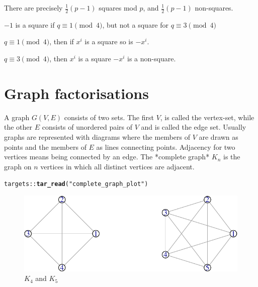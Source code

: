 \documentclass[
  11pt,
  a4paper]{book}\usepackage[]{graphicx}\usepackage[]{xcolor}
\makeatletter
\def\maxwidth{ %
  \ifdim\Gin@nat@width>\linewidth
    \linewidth
  \else
    \Gin@nat@width
  \fi
}
\newcommand{\hlstr}[1]{\textcolor[rgb]{0.192,0.494,0.8}{#1}}%
\newcommand{\hlopt}[1]{\textcolor[rgb]{0,0,0}{#1}}%
\newcommand{\hlstd}[1]{\textcolor[rgb]{0.345,0.345,0.345}{#1}}%
\newcommand{\hlkwd}[1]{\textcolor[rgb]{0.737,0.353,0.396}{\textbf{#1}}}%
\newenvironment{kframe}{%
 \def\at@end@of@kframe{}%
 \ifinner\ifhmode%
  \def\at@end@of@kframe{\end{minipage}}%
  \begin{minipage}{\columnwidth}%
 \fi\fi%
 \def\FrameCommand##1{\hskip\@totalleftmargin \hskip-\fboxsep
 \colorbox{shadecolor}{##1}\hskip-\fboxsep
     \hskip-\linewidth \hskip-\@totalleftmargin \hskip\columnwidth}%
 \MakeFramed {\advance\hsize-\width
   \@totalleftmargin\z@ \linewidth\hsize
   \@setminipage}}%
 {\par\unskip\endMakeFramed%
 \at@end@of@kframe}
\newenvironment{knitrout}{}{} %
\def\maxwidth{\ifdim\Gin@nat@width>\linewidth\linewidth\else\Gin@nat@width\fi}
\makeatother
\begin{document}
There are precisely $\frac{1}{2}(p - 1)$ squares mod $p$, and $\frac{1}{2}(p - 1)$ non-squares.

$-1$ is a square if $q \equiv 1 \pmod 4$, but not a square for $q \equiv 3 \pmod 4$

$q \equiv 1 \pmod 4$, then if $x^i$ is a square so is $-x^i$.

$q \equiv 3 \pmod 4$, then $x^i$ is a square $-x^i$ is a non-square.
        


\chapter{Graph factorisations}

A graph $G(V,E)$ consists of two sets. The first $V$,
is called the vertex-set, while the other $E$ consists
of unordered pairs of $V$ and is called the edge set.
Usually graphs are represented with diagrams where the
members of $V$ are drawn as points and the members of
$E$ as lines connecting points. Adjacency for two vertices
means being connected by an edge. The *complete graph*
$K_n$ is the graph on $n$ vertices in which all distinct
vertices are adjacent.

\begin{knitrout}
\color{fgcolor}\begin{kframe}
\begin{alltt}
\hlstd{targets}\hlopt{::}\hlkwd{tar_read}\hlstd{(}\hlstr{"complete_graph_plot"}\hlstd{)}
\end{alltt}


{\ttfamily\noindent\color{warningcolor}{\#\# Warning: Using the `size` aesthetic in this geom was deprecated in ggplot2 3.4.0.\\\#\# i Please use `linewidth` in the `default\_aes` field and elsewhere instead.\\\#\# This warning is displayed once every 8 hours.\\\#\# Call `lifecycle::last\_lifecycle\_warnings()` to see where this warning was\\\#\# generated.}}\end{kframe}\begin{figure}
\includegraphics[width=\maxwidth]{figure/complete-graph-1} \caption[$K_4$ and $K_5$]{$K_4$ and $K_5$}\label{fig:complete-graph}
\end{figure}

\end{knitrout}
\end{document}
